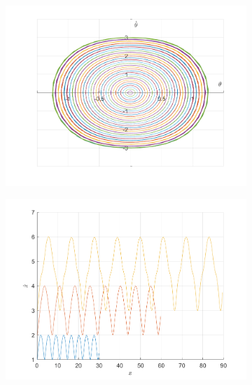 \documentclass{article}
\begin{document}
	\begin{figure}[h!]
		\centering
		\begin{subfigure}[b]{0.48\linewidth}
			\includegraphics[width=\linewidth]{./SmallOscillations/S3/F5.png}
		\end{subfigure}
		\begin{subfigure}[b]{0.48\linewidth}
			\includegraphics[width=\linewidth]{./SmallOscillations/S3/F6.png}
		\end{subfigure}
	\end{figure}
	\newpage
	
\end{document}
